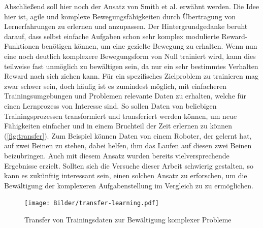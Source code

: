 Abschließend soll hier noch der Ansatz von Smith et al. \cite{smith2023learning} erwähnt werden.
Die Idee hier ist, agile und komplexe Bewegungsfähigkeiten durch Übertragung von Lernerfahrungen zu erlernen und anzupassen.
Der Hintergrundgedanke beruht darauf, dass selbst einfache Aufgaben schon sehr komplex modulierte Reward-Funktionen benötigen können, um eine gezielte Bewegung zu erhalten.
Wenn nun eine noch deutlich komplexere Bewegungsform von Null trainiert wird, kann dies teilweise fast unmöglich zu bewältigen sein, da nur ein sehr bestimmtes Verhalten Reward nach sich ziehen kann.
Für ein spezifisches Zielproblem zu trainieren mag zwar schwer sein, doch häufig ist es zumindest möglich, mit einfacheren Trainingsumgebungen und Problemen relevante Daten zu erhalten, welche für einen Lernprozess von Interesse sind.
So sollen Daten von beliebigen Trainingsprozessen transformiert und transferiert werden können, um neue Fähigkeiten einfacher und in einem Bruchteil der Zeit erlernen zu können (\autoref{fig:transfer}).
Zum Beispiel können Daten von einem Roboter, der gelernt hat, auf zwei Beinen zu stehen, dabei helfen, ihm das Laufen auf diesen zwei Beinen beizubringen.
Auch mit diesem Ansatz wurden bereits vielversprechende Ergebnisse erzielt.
Sollten sich die Versuche dieser Arbeit schwierig gestalten, so kann es zukünftig interessant sein, einen solchen Ansatz zu erforschen, um die Bewältigung der komplexeren Aufgabenstellung im Vergleich zu \cite{waidner.2020} zu ermöglichen.


\begin{figure}
    \centering
    \texttt{[image: Bilder/transfer-learning.pdf]}
    \caption{Transfer von Trainingsdaten zur Bewältigung komplexer Probleme \cite{smith2023learning}}
    \label{fig:transfer}
\end{figure}